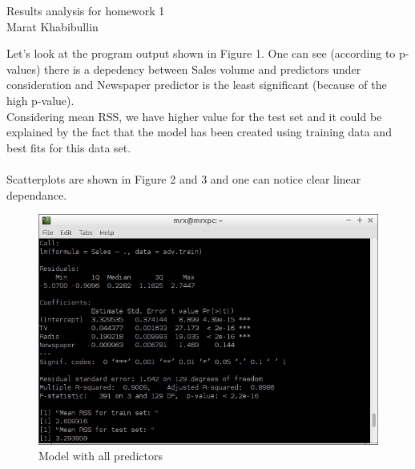 \documentclass[10pt,a4paper]{article}
\begin{document}
\begin{center}
Results analysis for homework 1\\
Marat Khabibullin
\end{center}

Let's look at the program output shown in Figure 1. One can see (according to p-values) there is a depedency between Sales volume and predictors under consideration and Newspaper predictor is the least significant (because of the high p-value).\\
Considering mean RSS, we have higher value for the test set and it could be explained by the fact that the model has been created using training data and best fits for this data set.\\
\\
Scatterplots are shown in Figure 2 and 3 and one can notice clear linear dependance.

\begin{figure}[H]
\centering
\includegraphics[width=140mm]{figures/ord.png}
\caption{Model with all predictors \label{overflow}}
\end{figure}
\end{document}
